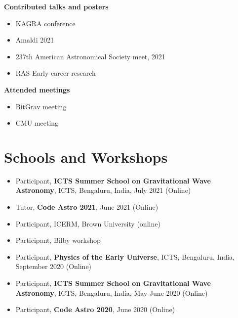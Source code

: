 \documentclass[margin, centered]{res}
\begin{document}
\begin{resume}
\textbf{Contributed talks and posters}\\
\begin{itemize}[leftmargin=*]
    \item KAGRA conference %
    \item Amaldi 2021 %
    \item 237th American Astronomical Society meet, 2021 %
    \item RAS Early career research
\end{itemize}   
\textbf{Attended meetings}\\
\begin{itemize}[leftmargin=*]
    \item BitGrav meeting %
    \item CMU meeting
\end{itemize}


\section{Schools and Workshops}
\begin{itemize}[leftmargin=*]
	\item Participant, \textbf{ICTS Summer School on Gravitational Wave Astronomy}, ICTS, Bengaluru, India, July 2021 (Online)
	\item Tutor, \textbf{Code Astro 2021}, June 2021 (Online)
	\item Participant, ICERM, Brown University (online)
	\item Participant, Bilby workshop
	\item Participant, \textbf{Physics of the Early Universe}, ICTS, Bengaluru, India, September 2020 (Online)
	\item Participant, \textbf{ICTS Summer School on Gravitational Wave Astronomy}, ICTS, Bengaluru, India, May-June 2020 (Online)
	\item Participant, \textbf{Code Astro 2020}, June 2020 (Online)
\end{itemize}


\end{resume}
\end{document}
